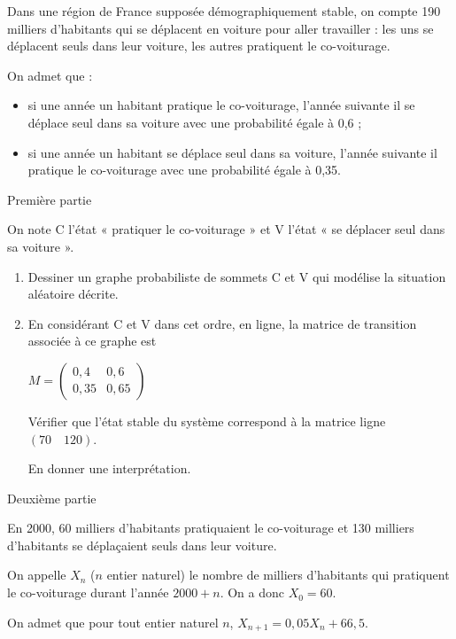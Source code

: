 
%
Dans une région de France supposée démographiquement stable, on compte 190 milliers d'habitants qui se déplacent en voiture pour aller travailler : les uns se déplacent seuls dans leur voiture, les autres pratiquent le co-voiturage.
\par
On admet que :
\begin{itemize}
     \item
     si une année un habitant pratique le co-voiturage, l'année suivante il se déplace seul dans sa voiture avec une probabilité égale à 0,6 ;
     \item
     si une année un habitant se déplace seul dans sa voiture, l'année suivante il pratique le co-voiturage avec une probabilité égale à 0,35.
\end{itemize}
\begin{h2}Première partie\end{h2}
On note C l'état « pratiquer le co-voiturage » et V l'état « se déplacer seul dans sa voiture ».
\begin{enumerate}
     \item
     Dessiner un graphe probabiliste de sommets C et V qui modélise la situation aléatoire décrite.
     \item
     En considérant C et V dans cet ordre, en ligne, la matrice de transition associée à ce graphe est
     \par
     $M=\begin{pmatrix} 0,4 & 0,6  \\ 0,35 & 0,65 \end{pmatrix}$
     \par
     Vérifier que l'état stable du système correspond à la matrice ligne $\left(70 \quad 120\right)$.
     \par
     En donner une interprétation.
\end{enumerate}
\begin{h2}Deuxième partie\end{h2}
En 2000, 60 milliers d'habitants pratiquaient le co-voiturage et 130 milliers d'habitants se déplaçaient seuls dans leur voiture.
\par
On appelle $X_{n}$ ($n$ entier naturel) le nombre de milliers d'habitants qui pratiquent le co-voiturage durant l'année $2000+n$. On a donc $X_{0}=60$.
\par
On admet que pour tout entier naturel $n$, $X_{n+1}=0,05X_{n}+66,5$.
